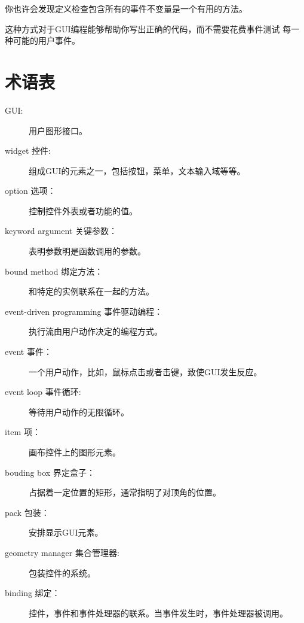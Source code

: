 你也许会发现定义检查包含所有的事件不变量是一个有用的方法。


这种方式对于GUI编程能够帮助你写出正确的代码，而不需要花费事件测试
每一种可能的用户事件。

\section{术语表}

\begin{description}

\item [GUI:] 用户图形接口。
\index [GUI]

\item [widget 控件:]组成GUI的元素之一，包括按钮，菜单，文本输入域等等。

\item [option 选项：]控制控件外表或者功能的值。

\item [keyword argument 关键参数：]表明参数明是函数调用的参数。

\item [bound method 绑定方法：]和特定的实例联系在一起的方法。

\item [event-driven programming 事件驱动编程：]执行流由用户动作决定的编程方式。

\item [event 事件：] 一个用户动作，比如，鼠标点击或者击键，致使GUI发生反应。

\item [event loop 事件循环:]等待用户动作的无限循环。

\item [item 项：]画布控件上的图形元素。

\item [bouding box 界定盒子：]占据着一定位置的矩形，通常指明了对顶角的位置。

\item [pack 包装：]安排显示GUI元素。

\item [geometry manager 集合管理器:]包装控件的系统。

\item [binding 绑定：]控件，事件和事件处理器的联系。当事件发生时，事件处理器被调用。

\end{description}

